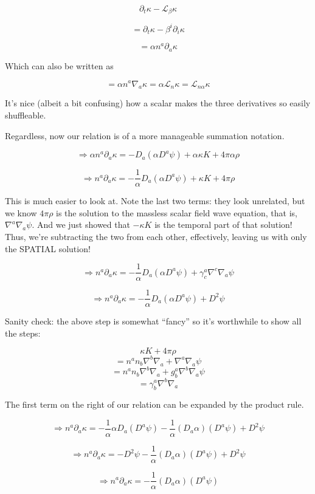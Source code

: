 \documentclass[landscape,letterpaper,10pt,english]{article}
\begin{document}
\[ \partial_t \kappa - \mathcal{L}_\beta \kappa \]

\[ = \partial_t \kappa - \beta^i \partial_i \kappa \]

\[ = \alpha n^a \partial_a \kappa \]

Which can also be written as

\[ = \alpha n^a \nabla_a \kappa = \alpha \mathcal{L}_n \kappa = \mathcal{L}_{n\alpha} \kappa\]

It's nice (albeit a bit confusing) how a scalar makes the three
derivatives so easily shuffleable.

    Regardless, now our relation is of a more manageable summation notation.

\[ \Rightarrow \alpha n^a \partial_a \kappa = -D_a(\alpha D^a \psi) + \alpha \kappa K + 4\pi \alpha\rho \]

\[ \Rightarrow n^a \partial_a \kappa = -\frac{1}{\alpha} D_a(\alpha D^a \psi) + \kappa K + 4 \pi \rho \]

This is much easier to look at. Note the last two terms: they look
unrelated, but we know \(4 \pi \rho\) is the solution to the massless
scalar field wave equation, that is, \(\nabla^a \nabla_a \psi\). And we
just showed that \(-\kappa K\) is the temporal part of that solution!
Thus, we're subtracting the two from each other, effectively, leaving us
with only the SPATIAL solution!

\[ \Rightarrow n^a \partial_a \kappa = -\frac{1}{\alpha} D_a(\alpha D^a \psi) + \gamma^a_c \nabla^c \nabla_a \psi \]

\[ \Rightarrow n^a \partial_a \kappa = -\frac{1}{\alpha} D_a(\alpha D^a \psi) + D^2 \psi \]

    Sanity check: the above step is somewhat ``fancy'' so it's worthwhile to
show all the steps:

\[ \kappa K + 4 \pi \rho \]
\[ = n^an_b\nabla^b\nabla_a + \nabla^a \nabla_a \psi \]
\[ = n^an_b\nabla^b\nabla_a + g^a_b \nabla^b \nabla_a \psi \]
\[ = \gamma^a_b \nabla^b\nabla_a \]

    The first term on the right of our relation can be expanded by the
product rule.

\[ \Rightarrow n^a \partial_a \kappa = -\frac{1}{\alpha} \alpha D_a( D^a \psi) -\frac{1}{\alpha} (D_a\alpha) (D^a \psi) + D^2 \psi \]

\[ \Rightarrow n^a \partial_a \kappa = - D^2 \psi - \frac{1}{\alpha} (D_a\alpha) (D^a \psi) + D^2 \psi \]

\[ \Rightarrow n^a \partial_a \kappa = - \frac{1}{\alpha} (D_a\alpha) (D^a \psi) \]
\end{document}
